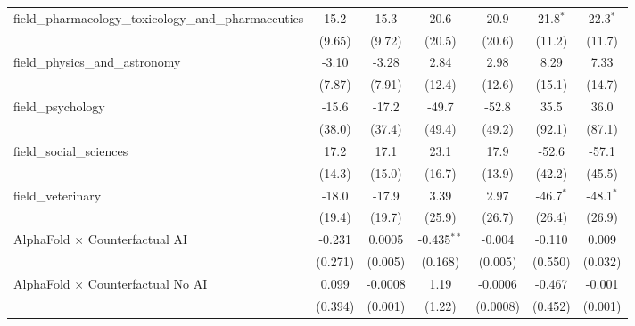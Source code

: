 \begin{tabular}{lcccccc}
   field\_pharmacology\_toxicology\_and\_pharmaceutics         & 15.2          & 15.3          & 20.6           & 20.9           & 21.8$^{*}$  & 22.3$^{*}$\\   
                                                               & (9.65)        & (9.72)        & (20.5)         & (20.6)         & (11.2)      & (11.7)\\   
   field\_physics\_and\_astronomy                              & -3.10         & -3.28         & 2.84           & 2.98           & 8.29        & 7.33\\   
                                                               & (7.87)        & (7.91)        & (12.4)         & (12.6)         & (15.1)      & (14.7)\\   
   field\_psychology                                           & -15.6         & -17.2         & -49.7          & -52.8          & 35.5        & 36.0\\   
                                                               & (38.0)        & (37.4)        & (49.4)         & (49.2)         & (92.1)      & (87.1)\\   
   field\_social\_sciences                                     & 17.2          & 17.1          & 23.1           & 17.9           & -52.6       & -57.1\\   
                                                               & (14.3)        & (15.0)        & (16.7)         & (13.9)         & (42.2)      & (45.5)\\   
   field\_veterinary                                           & -18.0         & -17.9         & 3.39           & 2.97           & -46.7$^{*}$ & -48.1$^{*}$\\   
                                                               & (19.4)        & (19.7)        & (25.9)         & (26.7)         & (26.4)      & (26.9)\\   
   AlphaFold $\times$ Counterfactual AI                        & -0.231        & 0.0005        & -0.435$^{**}$  & -0.004         & -0.110      & 0.009\\   
                                                               & (0.271)       & (0.005)       & (0.168)        & (0.005)        & (0.550)     & (0.032)\\   
   AlphaFold $\times$ Counterfactual No AI                     & 0.099         & -0.0008       & 1.19           & -0.0006        & -0.467      & -0.001\\   
                                                               & (0.394)       & (0.001)       & (1.22)         & (0.0008)       & (0.452)     & (0.001)\\   

\end{tabular}
